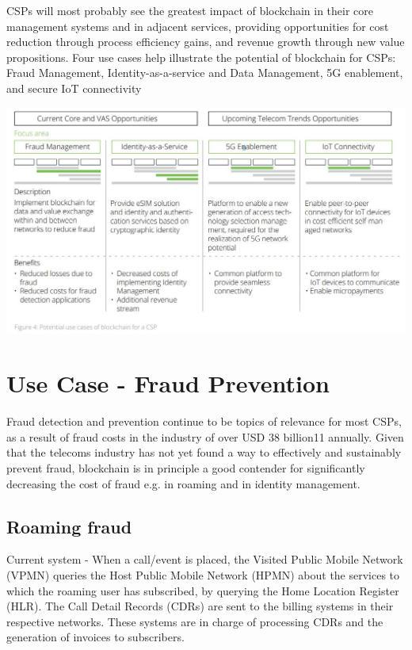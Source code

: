 \documentclass[12pt]{article}
\begin{document}
CSPs will most probably see the greatest
impact of blockchain in their core
management systems and in adjacent
services, providing opportunities for cost
reduction through process efficiency gains,
and revenue growth through new value propositions. Four use cases help illustrate
the potential of blockchain for CSPs: Fraud
Management, Identity-as-a-service and
Data Management, 5G enablement, and
secure IoT connectivity

\includegraphics[width=1\textwidth]{"fig4.jpg"}

\section{Use Case - Fraud Prevention}

Fraud detection and prevention continue
to be topics of relevance for most CSPs,
as a result of fraud costs in the industry of
over USD 38 billion11 annually. Given that
the telecoms industry has not yet found a
way to effectively and sustainably prevent
fraud, blockchain is in principle a good
contender for significantly decreasing the
cost of fraud e.g. in roaming and in identity
management. 

\subsection{Roaming fraud}
Current system - When a call/event is
placed, the Visited Public Mobile Network
(VPMN) queries the Host Public Mobile
Network (HPMN) about the services to
which the roaming user has subscribed,
by querying the Home Location Register
(HLR). The Call Detail Records (CDRs) are
sent to the billing systems in their respective
networks. These systems are in charge
of processing CDRs and the generation of
invoices to subscribers.
\end{document}
